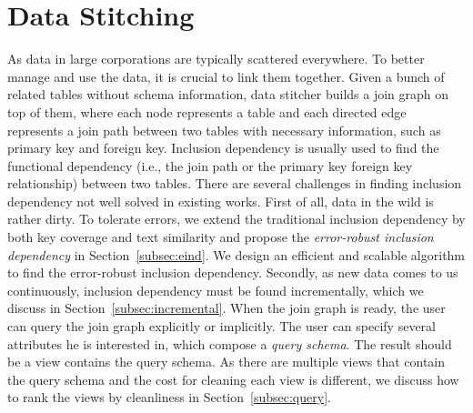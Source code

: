 

\newcommand{\eind}{error-robust inclusion dependency\xspace}
\newcommand{\ind}{inclusion dependency\xspace}
\newcommand{\R}{\ensuremath{R}\xspace}
\renewcommand{\S}{\ensuremath{S}\xspace}
\newcommand{\X}{\ensuremath{X}\xspace}
\newcommand{\Y}{\ensuremath{Y}\xspace}

\newtheorem{theorem}{Theorem}
\newtheorem{example}{Example}
\newtheorem{definition}{Definition}
\newtheorem{proposition}{Proposition}
\newtheorem{lemma}{Lemma}
\newtheorem{corollary}{Corollary}

\section{Data Stitching}\label{sec:stitching}




As data in large corporations are typically scattered everywhere. To better manage and use the data, it is crucial to link them together. Given a bunch of related tables without schema information, data stitcher builds a join graph on top of them, where each node represents a table and each directed edge represents a join path between two tables with necessary information, such as primary key and foreign key. Inclusion dependency is usually used to find the functional dependency (i.e., the join path or the primary key foreign key relationship) between two tables. There are several challenges in finding inclusion dependency not well solved in existing works. First of all, data in the wild is rather dirty. To tolerate errors, we extend the traditional inclusion dependency by both key coverage and text similarity and propose the \emph{\eind} in Section~\ref{subsec:eind}. We design an efficient and scalable algorithm to find the \eind. Secondly, as new data comes to us continuously, inclusion dependency must be found incrementally, which we discuss in Section~\ref{subsec:incremental}. When the join graph is ready, the user can query the join graph explicitly or implicitly. The user can specify several attributes he is interested in, which compose a \emph{query schema}. The result should be a view contains the query schema. As there are multiple views that contain the query schema and the cost for cleaning each view is different, we discuss how to rank the views by cleanliness in Section~\ref{subsec:query}.


